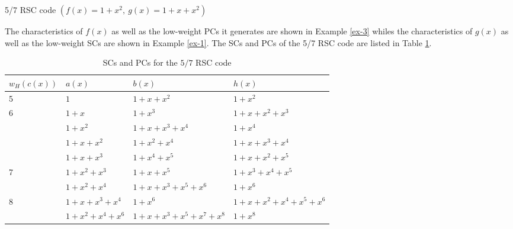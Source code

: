 \begin{example} {5/7 RSC code $\left(f(x)=1+x^2,~g(x)=1+x+x^2\right)$}
	
	The characteristics of $f(x)$ as well as the low-weight PCs it generates are shown in Example \ref{ex-3}  whiles the characteristics of $g(x)$ as well as the low-weight SCs are shown in  Example \ref{ex-1}. The SCs and PCs of the 5/7 RSC code are listed in Table \ref{novelTab13}. 
	\begin{table}[htbp]
		\caption{SCs and PCs for the $5/7$ RSC code}
		\centering
		\begin{tabularx}{0.75\textwidth}{Xlll} 
			\toprule
			$w_H(c(x))$& $a(x)$ & $b(x)$ & $h(x)$ \\ %
			\midrule
			5&$1$ & $1+x+x^{2}$ & $1+x^2$\\
			\hline
			6&$1+x$ & $1+x^3$ & $1+x+x^2+x^3$\\
			&$1+x^2$ & $1+x+x^3+x^4$ & $1+x^{4}$\\
			\hline
			&$1+x+x^2$ & $1+x^2+x^4$ & $1+x+x^3+x^4$\\
			&$1+x+x^3$ & $1+x^4+x^5$ & $1+x+x^2+x^5$\\
			7&$1+x^2+x^3$ & $1+x+x^5$ & $1+x^3+x^4+x^5$\\
			&$1+x^2+x^4$ & $1+x+x^3+x^5+x^6$ & $1+x^{6}$\\			
			\hline
			8&$1+x+x^3+x^4$ & $1+x^6$ & $1+x+x^2+x^4+x^5+x^6$\\
			&$1+x^2+x^4+x^6$ & $1+x+x^3+x^5+x^7+x^8$ & $1+x^8$\\
			
			\bottomrule
		\end{tabularx}
		
		\label{novelTab13}
	\end{table}
\end{example}


